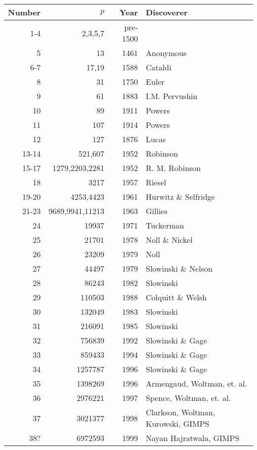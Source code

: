 \bigskip
\bigskip
\hspace{2cm}
\begin{tabular}{|r|r|r|l|} \hline

{Number} & {$p$} & {Year}& {Discoverer} \\ \hline

     1-4 &   2,3,5,7      &             pre-1500 &\\
     5   &      13        &                1461 & Anonymous \\
     6-7 &      17,19        &             1588 & Cataldi\\
     8   &       31          &             1750 & Euler\\
     9   &       61          &             1883 & I.M. Pervushin\\
    10   &       89          &             1911 & Powers\\
    11   &       107         &             1914 & Powers\\
    12   &       127         &             1876 & Lucas\\
    13-14&       521,607     &             1952 & Robinson\\
    15-17&       1279,2203,2281  &         1952 & R. M. Robinson\\
    18   &       3217            &         1957 & Riesel\\
    19-20&       4253,4423       &         1961 & Hurwitz \& Selfridge \\
    21-23&       9689,9941,11213 &         1963 & Gillies\\
    24   &       19937           &         1971 & Tuckerman\\
    25   &       21701           &         1978 & Noll \& Nickel\\
    26   &       23209           &         1979 & Noll\\
    27   &       44497           &         1979 & Slowinski \& Nelson\\
    28   &       86243           &         1982 & Slowinski\\
    29   &       110503          &         1988 & Colquitt \& Welsh\\
    30   &       132049          &         1983 & Slowinski\\
    31   &       216091          &         1985 & Slowinski\\
    32   &       756839          &         1992 & Slowinski \& Gage\\
    33  &       859433          &         1994 & Slowinski \& Gage\\
    34  &      1257787          &         1996 & Slowinski \& Gage \\
    35  &      1398269          &         1996 & Armengaud, Woltman, et. al.\\
    36  &      2976221          &         1997 & Spence, Woltman, et. al.\\
    37 & 	3021377		&		1998 & Clarkson, Woltman, Kurowski, GIMPS \\
    38? & 	6972593		&		1999 & Nayan Hajratwala, GIMPS \\
\hline
\end{tabular}


